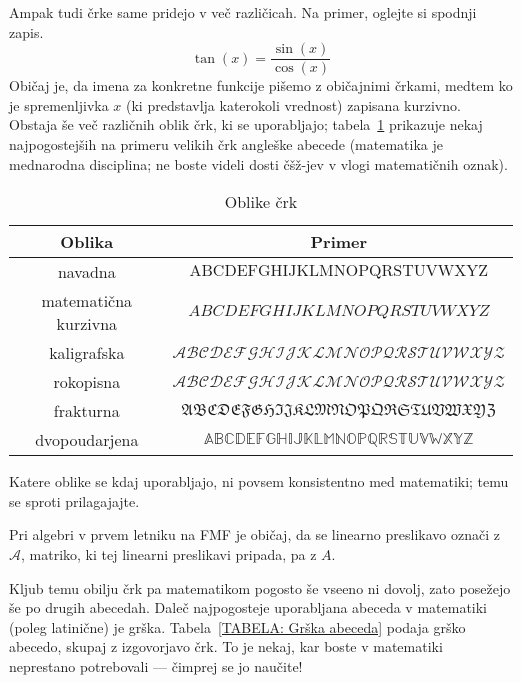 		Ampak tudi črke same pridejo v več različicah. Na primer, oglejte si spodnji zapis.
		\[\tan(x) = \frac{\sin(x)}{\cos(x)}\]
		Običaj je, da imena za konkretne funkcije pišemo z običajnimi črkami, medtem ko je spremenljivka $x$ (ki predstavlja katerokoli vrednost) zapisana kurzivno. Obstaja še več različnih oblik črk, ki se uporabljajo; tabela~\ref{TABELA: Oblike črk} prikazuje nekaj najpogostejših na primeru velikih črk angleške abecede (matematika je mednarodna disciplina; ne boste videli dosti čšž-jev v vlogi matematičnih oznak).
		
		\begin{table}[!ht]
			\centering
			\begin{tabular}{c|c}
				\textbf{Oblika} & \textbf{Primer} \\
				\hline
				navadna & $\mathrm{ABCDEFGHIJKLMNOPQRSTUVWXYZ}$ \\
				matematična kurzivna & $ABCDEFGHIJKLMNOPQRSTUVWXYZ$ \\
				kaligrafska & $\mathcal{ABCDEFGHIJKLMNOPQRSTUVWXYZ}$ \\
				rokopisna & $\mathscr{ABCDEFGHIJKLMNOPQRSTUVWXYZ}$ \\
				frakturna & $\mathfrak{ABCDEFGHIJKLMNOPQRSTUVWXYZ}$ \\
				dvopoudarjena & $\mathbb{ABCDEFGHIJKLMNOPQRSTUVWXYZ}$
			\end{tabular}
			\caption{Oblike črk}\label{TABELA: Oblike črk}
		\end{table}
		
		
		
		Katere oblike se kdaj uporabljajo, ni povsem konsistentno med matematiki; temu se sproti prilagajajte.
		
		\begin{zgled}
			Pri algebri v prvem letniku na FMF je običaj, da se linearno preslikavo označi z $\mathcal{A}$, matriko, ki tej linearni preslikavi pripada, pa z $A$.
		\end{zgled}
		
		Kljub temu obilju črk pa matematikom pogosto še vseeno ni dovolj, zato posežejo še po drugih abecedah. Daleč najpogosteje uporabljana abeceda v matematiki (poleg latinične) je grška. Tabela~\ref{TABELA: Grška abeceda} podaja grško abecedo, skupaj z izgovorjavo črk. To je nekaj, kar boste v matematiki neprestano potrebovali --- čimprej se jo naučite!
		
